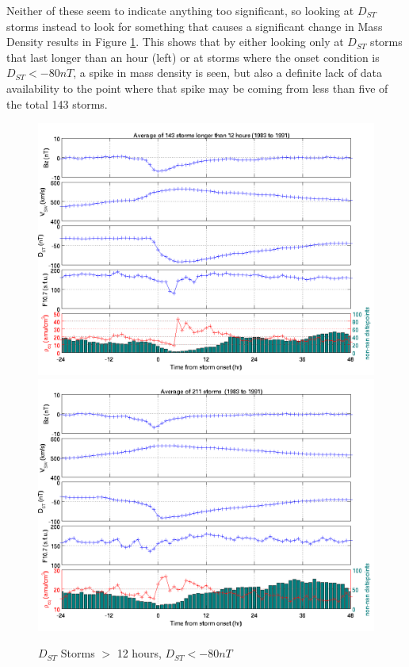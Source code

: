\documentclass[10pt,twocolumn]{article}
\begin{document}
Neither of these seem to indicate anything too significant, so looking at $D_{ST}$ storms instead to look for something that causes a significant change in Mass Density results in Figure \ref{Dspec}. This shows that by either looking only at $D_{ST}$ storms that last longer than an hour (left) or at storms where the onset condition is $D_{ST}<-80nT$, a spike in mass density is seen, but also a definite lack of data availability to the point where that spike may be coming from less than five of the total 143 storms. 

\begin{figure}[htp!]
\centering
\includegraphics[scale=0.35]{paperfigures/stormavs-dd12.png}
\includegraphics[scale=0.35]{paperfigures/stormavs-d80.png}
\caption{$D_{ST}$ Storms $>$ 12 hours, $D_{ST}<-80nT$}
\label{Dspec}
\end{figure}
\end{document}
